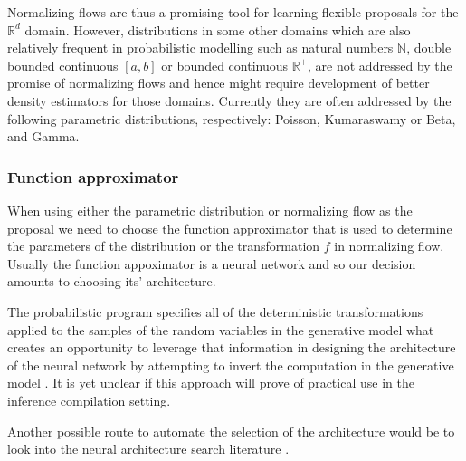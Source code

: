 \documentclass[12pt]{article}
\begin{document}

Normalizing flows are thus a promising tool for learning flexible proposals for the $\mathbb{R}^d$ domain.
However, distributions in some other domains which are also relatively frequent in probabilistic modelling such as natural numbers $\mathbb{N}$, double bounded continuous $[a,b]$ or bounded continuous $\mathbb{R}^+$, are not addressed by the promise of normalizing flows and hence might require development of better density estimators for those domains.
Currently they are often addressed by the following parametric distributions, respectively: Poisson, Kumaraswamy or Beta, and Gamma.



\subsubsection*{Function approximator}
When using either the parametric distribution or normalizing flow as the proposal we need to choose the function approximator that is used to determine the parameters of the distribution or the transformation $f$ in normalizing flow.
Usually the function appoximator is a neural network and so our decision amounts to choosing its' architecture.

The probabilistic program specifies all of the deterministic transformations applied to the samples of the random variables in the generative model
what creates an opportunity to leverage that information in designing the architecture of the neural network by attempting to invert the computation in the generative model \citep{TavaresEtAl2016,TavaresEtAl2017}.
It is yet unclear if this approach will prove of practical use in the inference compilation setting.

Another possible route to automate the selection of the architecture would be to look into the neural architecture search literature \citep{ElskenEtAl2018,ZophLe2017,pham18a}.






\end{document}
